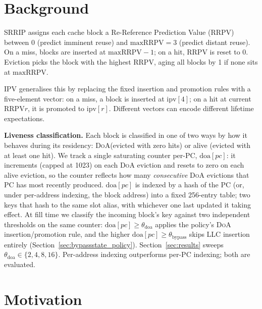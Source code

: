 \documentclass[conference]{IEEEtran}
\newcommand{\srrip}{\textsc{SRRIP}\xspace}
\newcommand{\ipv}{\textsc{IPV}\xspace}
\newcommand{\doa}{\textsc{DoA}\xspace}
\newcommand{\llc}{\textsc{LLC}\xspace}
\newcommand{\rrpv}{\textsc{RRPV}\xspace}
\begin{document}
\section{Background}

\srrip assigns each cache block a Re-Reference Prediction Value (\rrpv) between
0 (predict imminent reuse) and $\text{maxRRPV}=3$ (predict distant reuse). On a
miss, blocks are inserted at $\text{maxRRPV}-1$; on a hit, \rrpv is reset to 0.
Eviction picks the block with the highest \rrpv, aging all blocks by 1 if none
sits at $\text{maxRRPV}$.

\ipv generalises this by replacing the fixed insertion and promotion rules with
a five-element vector: on a miss, a block is inserted at $\text{ipv}[4]$; on a
hit at current \rrpv $r$, it is promoted to $\text{ipv}[r]$. Different vectors
can encode different lifetime expectations.

\textbf{Liveness classification.}
Each block is classified in one of two ways by how it behaves during its
residency: \doa (evicted with zero hits) or alive (evicted with at least one
hit). We track a single saturating counter per-\textsc{PC}, $\text{doa}[pc]$:
it increments (capped at 1023) on each \doa eviction and resets to zero on
each alive eviction, so the counter reflects how many \emph{consecutive}
\doa evictions that \textsc{PC} has most recently produced.
$\text{doa}[pc]$ is indexed by a hash of the \textsc{PC}
(or, under per-address indexing, the block address) into a fixed 256-entry
table; two keys that hash to the same slot alias, with whichever one last
updated it taking effect.
At fill time we classify the incoming block's key against two independent
thresholds on the same counter: $\text{doa}[pc] \geq \theta_{\mathrm{doa}}$
applies the policy's \doa insertion/promotion rule, and the higher
$\text{doa}[pc] \geq \theta_{\mathrm{bypass}}$ skips \llc insertion entirely
(Section~\ref{sec:bypassstate_policy}). Section~\ref{sec:results} sweeps
$\theta_{\mathrm{doa}} \in \{2, 4, 8, 16\}$.
Per-address indexing outperforms per-PC indexing; both are evaluated.

\section{Motivation}
\end{document}
